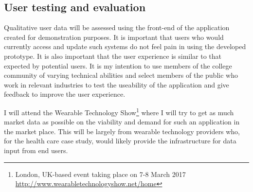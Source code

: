 \subsection{User testing and evaluation}

Qualitative user data will be assessed using the front-end of the application created for demonstration purposes. It is important that users who would currently access and update such systems do not feel pain in using the developed prototype. It is also important that the user experience is similar to that expected by potential users. It is my intention to use members of the college community of varying technical abilities and select members of the public who work in relevant industries to test the useability of the application and give feedback to improve the user experience.

I will attend the Wearable Technology Show\footnote{London, UK-based event taking place on 7-8 March 2017 \url{http://www.wearabletechnologyshow.net/home}} where I will try to get as much market data as possible on the viability and demand for such an application in the market place. This will be largely from wearable technology providers who, for the health care case study, would likely provide the infrastructure for data input from end users.



%
%
%
%
%
%
